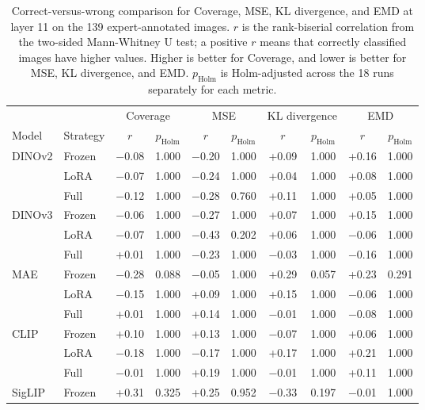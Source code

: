 \documentclass[lineno,pdflatex,sn-mathphys-num]{sn-jnl}%
\theoremstyle{thmstyleone}%
\theoremstyle{thmstyletwo}%
\theoremstyle{thmstylethree}%
\begin{document}
\begin{appendices}
\begin{table}[!h]
\centering
\caption{Correct-versus-wrong comparison for Coverage, MSE, KL divergence, and EMD at layer 11 on the 139 expert-annotated images. $r$ is the rank-biserial correlation from the two-sided Mann-Whitney U test; a positive $r$ means that correctly classified images have higher values. Higher is better for Coverage, and lower is better for MSE, KL divergence, and EMD. $p_{\text{Holm}}$ is Holm-adjusted across the 18 runs separately for each metric.\label{table appendix correctness}}
\begin{tabular}{llcccccccc}
\toprule
 & & \multicolumn{2}{c}{Coverage} & \multicolumn{2}{c}{MSE} & \multicolumn{2}{c}{KL divergence} & \multicolumn{2}{c}{EMD} \\
Model & Strategy & $r$ & $p_{\text{Holm}}$ & $r$ & $p_{\text{Holm}}$ & $r$ & $p_{\text{Holm}}$ & $r$ & $p_{\text{Holm}}$ \\ \midrule
DINOv2   & Frozen & $-$0.08 & 1.000 & $-$0.20 & 1.000 & +0.09 & 1.000 & +0.16 & 1.000 \\
         & LoRA   & $-$0.07 & 1.000 & $-$0.24 & 1.000 & +0.04 & 1.000 & +0.08 & 1.000 \\
         & Full   & $-$0.12 & 1.000 & $-$0.28 & 0.760 & +0.11 & 1.000 & +0.05 & 1.000 \\ \midrule
DINOv3   & Frozen & $-$0.06 & 1.000 & $-$0.27 & 1.000 & +0.07 & 1.000 & +0.15 & 1.000 \\
         & LoRA   & $-$0.07 & 1.000 & $-$0.43 & 0.202 & +0.06 & 1.000 & $-$0.06 & 1.000 \\
         & Full   & +0.01 & 1.000 & $-$0.23 & 1.000 & $-$0.03 & 1.000 & $-$0.16 & 1.000 \\ \midrule
MAE      & Frozen & $-$0.28 & 0.088 & $-$0.05 & 1.000 & +0.29 & 0.057 & +0.23 & 0.291 \\
         & LoRA   & $-$0.15 & 1.000 & +0.09 & 1.000 & +0.15 & 1.000 & $-$0.06 & 1.000 \\
         & Full   & +0.01 & 1.000 & +0.14 & 1.000 & $-$0.01 & 1.000 & $-$0.08 & 1.000 \\ \midrule
CLIP     & Frozen & +0.10 & 1.000 & +0.13 & 1.000 & $-$0.07 & 1.000 & +0.06 & 1.000 \\
         & LoRA   & $-$0.18 & 1.000 & $-$0.17 & 1.000 & +0.17 & 1.000 & +0.21 & 1.000 \\
         & Full   & $-$0.01 & 1.000 & +0.19 & 1.000 & $-$0.01 & 1.000 & +0.11 & 1.000 \\ \midrule
SigLIP   & Frozen & +0.31 & 0.325 & +0.25 & 0.952 & $-$0.33 & 0.197 & $-$0.01 & 1.000 \\

\end{tabular}
\end{table}
\end{appendices}
\end{document}

